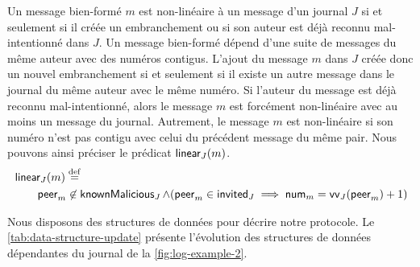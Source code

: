 Un message bien-formé $m$ est non-linéaire à un message d'un journal $J$ si et seulement si il créée un embranchement ou si son auteur est déjà reconnu mal-intentionné dans $J$.
%
Un message bien-formé dépend d'une suite de messages du même auteur avec des numéros contigus.
L'ajout du message $m$ dans $J$ créée donc un nouvel embranchement si et seulement si il existe un autre message dans le journal du même auteur avec le même numéro.
Si l'auteur du message est déjà reconnu mal-intentionné, alors le message $m$ est forcément non-linéaire avec au moins un message du journal.
Autrement, le message $m$ est non-linéaire si son numéro n'est pas contigu avec celui du précédent message du même pair.
Nous pouvons ainsi préciser le prédicat $\operatorname{\mathsf{linear}}_J(m)$.
%
%
\begin{equation}\begin{split}
\MoveEqLeft\trm{linear}_J(m) \defeq\\
&\trm{peer}_m \not\in \trm{knownMalicious}_J \land (\trm{peer}_m \in \trm{invited}_J \implies \trm{num}_m = \trm{vv}_J(\trm{peer}_m) + 1)
\end{split}\end{equation}

Nous disposons des structures de données pour décrire notre protocole.
Le \autoref{tab:data-structure-update} présente l'évolution des structures de données dépendantes du journal de la \autoref{fig:log-example-2}.

